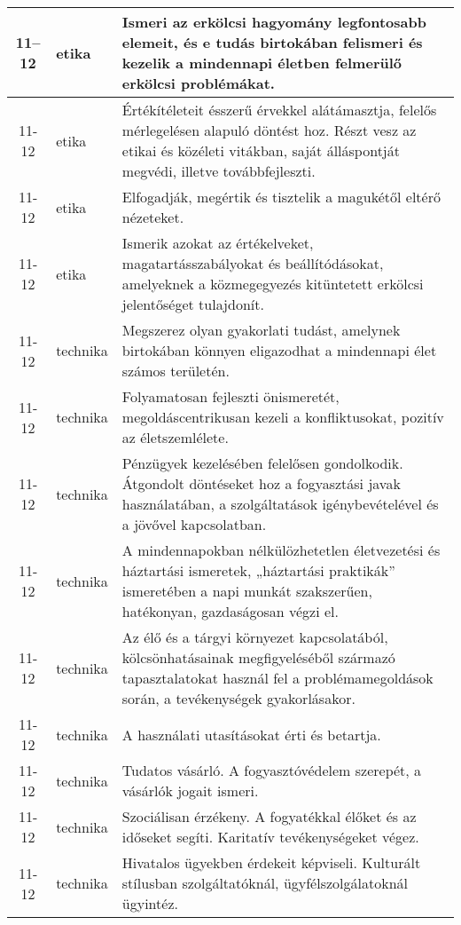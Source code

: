 \begin{small}
\begin{longtable}{c | p{2cm} |  p{11cm} }
              11--12 & etika & Ismeri az erkölcsi hagyomány legfontosabb elemeit, és e tudás birtokában felismeri és kezelik a mindennapi életben felmerülő erkölcsi problémákat. \\ \hline
              11-12 & etika & Értékítéleteit ésszerű érvekkel alátámasztja, felelős mérlegelésen alapuló döntést hoz. Részt vesz az etikai és közéleti vitákban, saját álláspontját megvédi, illetve továbbfejleszti. \\ \hline
              11-12 & etika & Elfogadják, megértik és tisztelik a magukétől eltérő nézeteket. \\ \hline
              11-12 & etika & Ismerik azokat az értékelveket, magatartásszabályokat és beállítódásokat, amelyeknek a közmegegyezés kitüntetett erkölcsi jelentőséget tulajdonít. \\ \hline
              11-12 & technika & Megszerez olyan gyakorlati tudást, amelynek birtokában könnyen eligazodhat a mindennapi élet számos területén. \\ \hline
              11-12 & technika & Folyamatosan fejleszti önismeretét, megoldáscentrikusan kezeli a konfliktusokat,  pozitív az életszemlélete. \\ \hline
              11-12 & technika & Pénzügyek kezelésében felelősen gondolkodik. Átgondolt döntéseket hoz a fogyasztási javak használatában, a szolgáltatások igénybevételével és a jövővel kapcsolatban. \\ \hline
              11-12 & technika & A mindennapokban nélkülözhetetlen életvezetési és háztartási ismeretek, „háztartási praktikák” ismeretében a napi munkát szakszerűen, hatékonyan, gazdaságosan végzi el. \\ \hline
              11-12 & technika & Az élő és a tárgyi környezet kapcsolatából, kölcsönhatásainak megfigyeléséből származó tapasztalatokat használ fel a problémamegoldások során, a tevékenységek gyakorlásakor. \\ \hline
              11-12 & technika & A használati utasításokat érti és betartja. \\ \hline
              11-12 & technika & Tudatos vásárló. A fogyasztóvédelem szerepét, a vásárlók jogait ismeri. \\ \hline
              11-12 & technika & Szociálisan érzékeny. A fogyatékkal élőket és az időseket segíti. Karitatív tevékenységeket végez. \\ \hline
              11-12 & technika & Hivatalos ügyekben érdekeit képviseli. Kulturált stílusban szolgáltatóknál, ügyfélszolgálatoknál ügyintéz. \\ \hline

\end{longtable}
\end{small}
